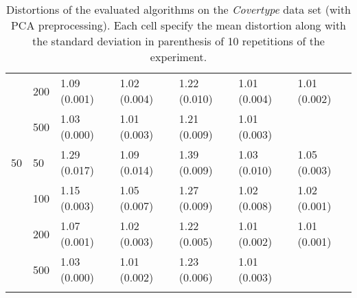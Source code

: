 \begin{longtable}{lllllll}
   & 200 &  1.09 (0.001) &   1.02 (0.004) &  1.22 (0.010) &         1.01 (0.004) &  1.01 (0.002) \\
   & 500 &  1.03 (0.000) &   1.01 (0.003) &  1.21 (0.009) &         1.01 (0.003) &  \\
 \midrule
50 & 50  &  1.29 (0.017) &   1.09 (0.014) &  1.39 (0.009) &         1.03 (0.010) &  1.05 (0.003) \\
   & 100 &  1.15 (0.003) &   1.05 (0.007) &  1.27 (0.009) &         1.02 (0.008) &  1.02 (0.001) \\
   & 200 &  1.07 (0.001) &   1.02 (0.003) &  1.22 (0.005) &         1.01 (0.002) &  1.01 (0.001) \\
   & 500 &  1.03 (0.000) &   1.01 (0.002) &  1.23 (0.006) &         1.01 (0.003) &            \\
\bottomrule
\caption{Distortions of the evaluated algorithms on the \textit{Covertype} data set (with PCA preprocessing). Each cell specify the mean distortion along with the standard deviation in parenthesis of 10 repetitions of the experiment.}
\label{tab:distortions-mean-std-covertype-pca}
\end{longtable}

